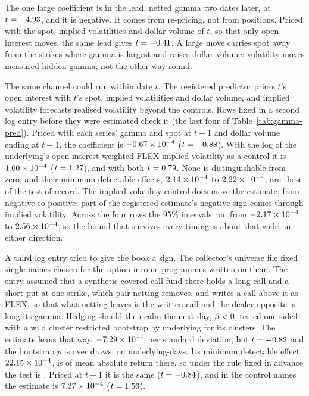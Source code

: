 \documentclass[11pt]{article}
\begin{document}
The one large coefficient is in the lead, netted gamma two dates later, at
$t=-4.93$, and it is negative. It comes from re-pricing, not from positions. Priced
with the spot, implied volatilities and dollar volume of $t$, so that only open interest
moves, the same lead gives $t=-0.41$. A large move carries spot away from the
strikes where gamma is largest and raises dollar volume: volatility moves measured hidden
gamma, not the other way round.

The same channel could run within date $t$. The registered predictor prices $t$'s open
interest with $t$'s spot, implied volatilities and dollar volume, and implied volatility
forecasts realised volatility beyond the controls. Rows fixed in a second log entry before
they were estimated check it (the last four of Table~\ref{tab:gamma-pred}). Priced with
each series' gamma and spot at $t-1$ and dollar volume ending at $t-1$, the coefficient is
$-0.67\times10^{-4}$ ($t=-0.88$). With the log of the underlying's
open-interest-weighted FLEX implied volatility as a control it is
$1.00\times10^{-4}$ ($t=1.27$), and with both $t=0.79$. None is
distinguishable from zero, and their minimum detectable effects,
$2.14\times10^{-4}$ to $2.22\times10^{-4}$, are those of the test of
record. The implied-volatility control does move the estimate, from negative to positive:
part of the registered estimate's negative sign comes through implied volatility. Across
the four rows the 95\% intervals run from $-2.17\times10^{-4}$ to
$2.56\times10^{-4}$, so the bound that survives every timing is about that wide,
in either direction.

A third log entry tried to give the book a sign. The collector's universe file fixed
\GProgListed{} single names chosen for the option-income programmes written on them. The
entry assumed that a synthetic covered-call fund there holds a long call and a short put at
one strike, which pair-netting removes, and writes a call above it as FLEX, so that what
netting leaves is the written call and the dealer opposite is long its gamma. Hedging
should then calm the next day, $\beta<0$, tested one-sided with a wild cluster restricted
bootstrap by underlying \citep{cameron2008} for its \GProgNames{} clusters. The estimate
leans that way, $-7.29\times10^{-4}$ per standard deviation, but $t=-0.82$ and the
bootstrap $p$ is \GProgWildP{} over \GProgDraws{} draws, on \GProgDays{} underlying-days.
Its minimum detectable effect, $22.15\times10^{-4}$, is \GProgMDEShare{} of mean
absolute return there, so under the rule fixed in advance the test is \GProgVerdict{}.
Priced at $t-1$ it is the same ($t=-0.84$), and in the \GProgControlNames{} control
names the estimate is $7.27\times10^{-4}$ ($t=1.56$).
\end{document}
